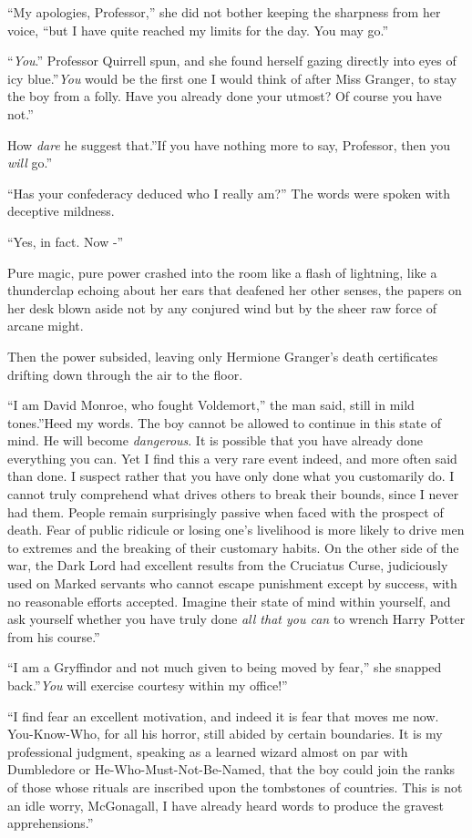 ``My apologies, Professor,'' she did not bother keeping the sharpness
from her voice, ``but I have quite reached my limits for the day. You
may go.''

``\emph{You}.'' Professor Quirrell spun, and she found herself gazing
directly into eyes of icy blue.''\emph{You} would be the first one I
would think of after Miss Granger, to stay the boy from a folly. Have
you already done your utmost? Of course you have not.''

How \emph{dare} he suggest that.''If you have nothing more to say,
Professor, then you \emph{will} go.''

``Has your confederacy deduced who I really am?'' The words were spoken
with deceptive mildness.

``Yes, in fact. Now -''

Pure magic, pure power crashed into the room like a flash of lightning,
like a thunderclap echoing about her ears that deafened her other
senses, the papers on her desk blown aside not by any conjured wind but
by the sheer raw force of arcane might.

Then the power subsided, leaving only Hermione Granger's death
certificates drifting down through the air to the floor.

``I am David Monroe, who fought Voldemort,'' the man said, still in mild
tones.''Heed my words. The boy cannot be allowed to continue in this
state of mind. He will become \emph{dangerous}. It is possible that you
have already done everything you can. Yet I find this a very rare event
indeed, and more often said than done. I suspect rather that you have
only done what you customarily do. I cannot truly comprehend what drives
others to break their bounds, since I never had them. People remain
surprisingly passive when faced with the prospect of death. Fear of
public ridicule or losing one's livelihood is more likely to drive men
to extremes and the breaking of their customary habits. On the other
side of the war, the Dark Lord had excellent results from the Cruciatus
Curse, judiciously used on Marked servants who cannot escape punishment
except by success, with no reasonable efforts accepted. Imagine their
state of mind within yourself, and ask yourself whether you have truly
done \emph{all that you can} to wrench Harry Potter from his course.''

``I am a Gryffindor and not much given to being moved by fear,'' she
snapped back.''\emph{You} will exercise courtesy within my office!''

``I find fear an excellent motivation, and indeed it is fear that moves
me now. You-Know-Who, for all his horror, still abided by certain
boundaries. It is my professional judgment, speaking as a learned wizard
almost on par with Dumbledore or He-Who-Must-Not-Be-Named, that the boy
could join the ranks of those whose rituals are inscribed upon the
tombstones of countries. This is not an idle worry, McGonagall, I have
already heard words to produce the gravest apprehensions.''

